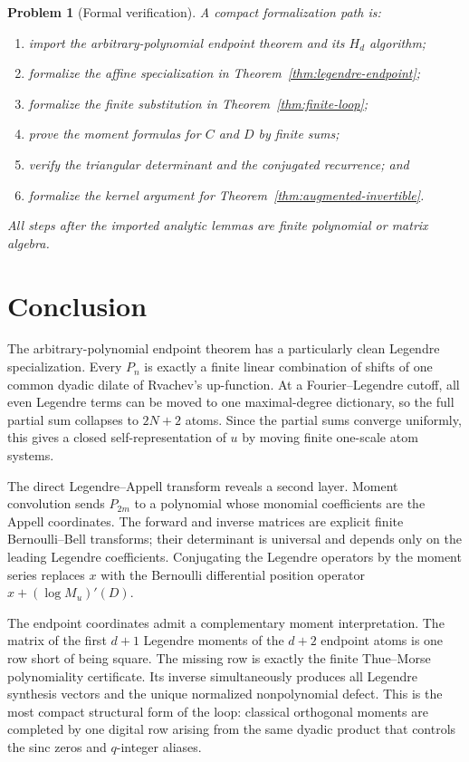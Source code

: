 \documentclass[11pt,oneside]{article}
\newtheorem{problem}[theorem]{Problem}
\theoremstyle{definition}
\theoremstyle{remark}
\begin{document}
\begin{problem}[Formal verification]
A compact formalization path is:
\begin{enumerate}
\item import the arbitrary-polynomial endpoint theorem and its $H_d$ algorithm;
\item formalize the affine specialization in Theorem~\ref{thm:legendre-endpoint};
\item formalize the finite substitution in Theorem~\ref{thm:finite-loop};
\item prove the moment formulas for $C$ and $D$ by finite sums;
\item verify the triangular determinant and the conjugated recurrence; and
\item formalize the kernel argument for Theorem~\ref{thm:augmented-invertible}.
\end{enumerate}
All steps after the imported analytic lemmas are finite polynomial or matrix
algebra.
\end{problem}

\section{Conclusion}
The arbitrary-polynomial endpoint theorem has a particularly clean Legendre
specialization.  Every $P_n$ is exactly a finite linear combination of shifts
of one common dyadic dilate of Rvachev's up-function.  At a Fourier--Legendre
cutoff, all even Legendre terms can be moved to one maximal-degree dictionary,
so the full partial sum collapses to $2N+2$ atoms.  Since the partial sums
converge uniformly, this gives a closed self-representation of $u$ by moving
finite one-scale atom systems.

The direct Legendre--Appell transform reveals a second layer.  Moment
convolution sends $P_{2m}$ to a polynomial whose monomial coefficients are the
Appell coordinates.  The forward and inverse matrices are explicit finite
Bernoulli--Bell transforms; their determinant is universal and depends only
on the leading Legendre coefficients.  Conjugating the Legendre operators by
the moment series replaces $x$ with the Bernoulli differential position
operator $x+(\log M_u)'(D)$.

The endpoint coordinates admit a complementary moment interpretation.  The
matrix of the first $d+1$ Legendre moments of the $d+2$ endpoint atoms is one
row short of being square.  The missing row is exactly the finite
Thue--Morse polynomiality certificate.  Its inverse simultaneously produces
all Legendre synthesis vectors and the unique normalized nonpolynomial defect.
This is the most compact structural form of the loop: classical orthogonal
moments are completed by one digital row arising from the same dyadic product
that controls the sinc zeros and $q$-integer aliases.
\end{document}
